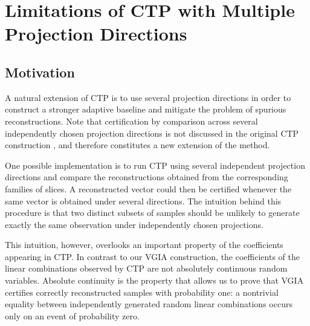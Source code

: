 \section{Limitations of CTP with Multiple Projection Directions}
\label{app:multiple-ctp-directions}

\subsection{Motivation}
\label{app:multiple-ctp-directions:motivation}

A natural extension of CTP is to use several projection directions in
order to construct a stronger adaptive baseline and mitigate the
problem of spurious reconstructions. Note that
certification by comparison across several independently chosen
projection directions is not discussed in the original CTP
construction \cite{ctp_paper}, and therefore constitutes a new extension of
the method.

One possible implementation is to run CTP using several independent
projection directions and compare the reconstructions obtained from
the corresponding families of slices. A reconstructed vector could
then be certified whenever the same vector is obtained under several
directions. The intuition behind this procedure is that two distinct
subsets of samples should be unlikely to generate exactly the same
observation under independently chosen projections.

This intuition, however, overlooks an important property of the
coefficients appearing in CTP. In contrast to our VGIA construction,
the coefficients of the linear combinations observed by CTP are not
absolutely continuous random variables. Absolute continuity is the
property that allows us to prove that VGIA certifies correctly
reconstructed samples with probability one: a nontrivial equality
between independently generated random linear combinations occurs only
on an event of probability zero.

